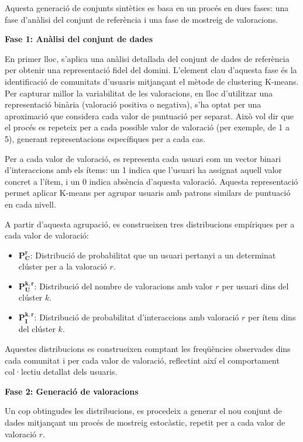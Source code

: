 \documentclass[a4paper,12pt]{report}
\begin{document}
Aquesta generació de conjunts sintètics es basa en un procés en dues fases: una fase d'anàlisi del conjunt de referència i una fase de mostreig de valoracions.

\textbf{Fase 1: Anàlisi del conjunt de dades}


En primer lloc, s’aplica una anàlisi detallada del conjunt de dades de referència per obtenir una representació fidel del domini. L’element clau d’aquesta fase és la identificació de comunitats d’usuaris mitjançant el mètode de clustering K-means. Per capturar millor la variabilitat de les valoracions, en lloc d’utilitzar una representació binària (valoració positiva o negativa), s’ha optat per una aproximació que considera cada valor de puntuació per separat. Això vol dir que el procés es repeteix per a cada possible valor de valoració (per exemple, de 1 a 5), generant representacions específiques per a cada cas.

Per a cada valor de valoració, es representa cada usuari com un vector binari d'interaccions amb els ítems: un 1 indica que l’usuari ha assignat aquell valor concret a l’ítem, i un 0 indica absència d’aquesta valoració. Aquesta representació permet aplicar K-means per agrupar usuaris amb patrons similars de puntuació en cada nivell.

A partir d’aquesta agrupació, es construeixen tres distribucions empíriques per a cada valor de valoració:

\begin{itemize}
    \item $\mathbf{P_C^r}$: Distribució de probabilitat que un usuari pertanyi a un determinat clúster per a la valoració $r$.
    \item $\mathbf{P_U^{k,r}}$: Distribució del nombre de valoracions amb valor $r$ per usuari dins del clúster $k$.
    \item $\mathbf{P_I^{k,r}}$: Distribució de probabilitat d’interaccions amb valoració $r$ per ítem dins del clúster $k$.
\end{itemize}

Aquestes distribucions es construeixen comptant les freqüències observades dins cada comunitat i per cada valor de valoració, reflectint així el comportament col·lectiu detallat dels usuaris.

\medskip

\textbf{Fase 2: Generació de valoracions}

Un cop obtingudes les distribucions, es procedeix a generar el nou conjunt de dades mitjançant un procés de mostreig estocàstic, repetit per a cada valor de valoració $r$.
\end{document}
